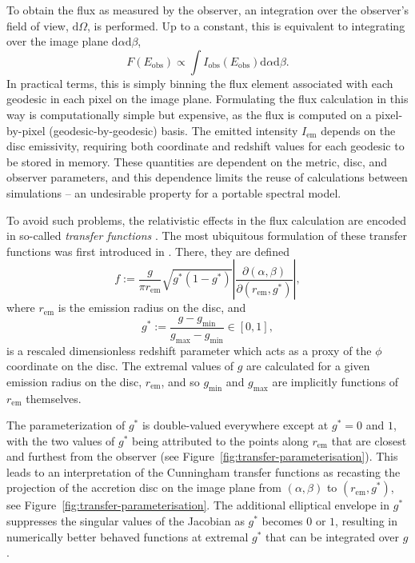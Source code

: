 \documentclass[fleqn,usenatbib]{mnras}
\renewcommand{\d}{\text{d}}
\newcommand{\rhoem}{r_\text{em}}
\newcommand{\jacobian}[2]{\left\lvert \frac{\partial #1}{\partial #2} \right\rvert}
\begin{document}
To obtain the flux as measured by the observer, an integration over the
observer's field of view, $\d \Omega$, is performed. Up to a constant, this is
equivalent to integrating over the image plane $\d \alpha \d \beta$,
\begin{equation}
\label{eq:integrate-impact-params}
F(E_\text{obs}) \propto \int I_\text{obs}(E_\text{obs}) \d \alpha \d \beta.
\end{equation}
In practical terms, this is simply binning the flux element associated with each
geodesic in each pixel on the image plane. Formulating the flux calculation in
this way is computationally simple but expensive, as the flux is computed on a
pixel-by-pixel (geodesic-by-geodesic) basis. The emitted intensity $I_\text{em}$
depends on the disc emissivity, requiring both coordinate and redshift values
for each geodesic to be stored in memory. These quantities are dependent on the
metric, disc, and observer parameters, and this dependence limits the reuse of
calculations between simulations -- an undesirable property for a portable
spectral model.

To avoid such problems, the relativistic effects in the flux calculation are
encoded in so-called \emph{transfer functions}
\citep[e.g.][]{brenneman_constraining_2006}. The most ubiquitous formulation of
these transfer functions was first introduced in \cite{cunningham_effects_1975}.
There, they are defined
\begin{equation}
    \label{eq:cunn-transfer-function}
    f:=\frac{g}{\pi \rhoem} \sqrt{g^\ast(1 - g^\ast)} \jacobian{(\alpha, \beta)}{(\rhoem, g^\ast)},
\end{equation}
where $\rhoem$ is the emission radius on the disc, and
\begin{equation}
    g^\ast := \frac{g - g_\text{min}}{g_\text{max} - g_\text{min}} \in [0, 1],
\end{equation}
is a rescaled dimensionless redshift parameter which acts as a proxy of the
$\phi$ coordinate on the disc. The extremal values of $g$ are
calculated for a given emission radius on the disc, $\rhoem$, and so
$g_\text{min}$ and $g_\text{max}$ are implicitly functions of $\rhoem$
themselves.

The parameterization of $g^\ast$ is double-valued everywhere except at $g^\ast =
0$ and $1$, with the two values of $g^\ast$ being attributed to the points along
$\rhoem$ that are closest and furthest from the observer (see
Figure~\ref{fig:transfer-parameterisation}). This leads to an interpretation of the
Cunningham transfer functions as recasting the projection of the accretion disc
on the image plane from $(\alpha, \beta)$ to $(\rhoem, g^\ast)$, see
Figure~\ref{fig:transfer-parameterisation}. The additional elliptical envelope in
$g^\ast$ suppresses the singular values of the Jacobian as $g^\ast$ becomes $0$
or $1$, resulting in numerically better behaved functions at extremal $g^\ast$
that can be integrated over $g$.
\end{document}
